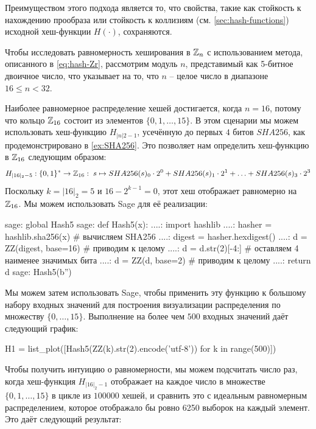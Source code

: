Преимуществом этого подхода является то, что свойства, такие как стойкость к нахождению прообраза или стойкость к коллизиям (см. \secname{} \ref{sec:hash-functions}) исходной хеш-функции $H(\cdot)$, сохраняются.
\begin{example} Чтобы исследовать равномерность хеширования в $\mathbb{Z}_n$ с использованием метода, описанного в \ref{eq:hash-Zr}, рассмотрим модуль $n$, представимый как 5-битное двоичное число, что указывает на то, что $n$ -- целое число в диапазоне $16 \leq n < 32$.

Наиболее равномерное распределение хешей достигается, когда $n = 16$, потому что кольцо $\mathbb{Z}_{16}$ состоит из элементов $\{0, 1, \ldots, 15\}$. В этом сценарии мы можем использовать хеш-функцию $H_{|n|2-1}$, усечённую до первых $4$ битов $SHA256$, как продемонстрировано в \examplename{} \ref{ex:SHA256}. Это позволяет нам определить хеш-функцию в $\mathbb{Z}_{16}$ следующим образом:
$$
H_{|16|_2-5}: \{0,1\}^* \to \mathbb{Z}_{16}:\; s\mapsto
SHA256(s)_0\cdot 2^0 + SHA256(s)_1\cdot 2^1 + \ldots + SHA256(s)_3\cdot 2^3
$$
Поскольку $k=|16|_2=5$ и $16-2^{k-1}=0$, этот хеш отображает равномерно на $\mathbb{Z}_{16}$. Мы можем использовать Sage для её реализации:
\begin{sagecommandline}
sage: global Hash5
sage: def Hash5(x):
....:     import hashlib
....:     hasher = hashlib.sha256(x) # вычисляем SHA256
....:     digest = hasher.hexdigest()
....:     d = ZZ(digest, base=16) # приводим к целому
....:     d = d.str(2)[-4:] # оставляем 4 наименее значимых бита
....:     d = ZZ(d, base=2) # приводим к целому
....:     return d
sage: Hash5(b'')
\end{sagecommandline}
Мы можем затем использовать Sage, чтобы применить эту функцию к большому набору входных значений для построения визуализации распределения по множеству $\{0,\ldots,15\}$. Выполнение на более чем $500$ входных значений даёт следующий график:
\begin{sagesilent}
H1 = list_plot([Hash5(ZZ(k).str(2).encode('utf-8')) for k in range(500)])
\end{sagesilent}
\begin{center}
\end{center}
Чтобы получить интуицию о равномерности, мы можем подсчитать число раз, когда хеш-функция $H_{|16|_2-1}$ отображает на каждое число в множестве $\{0,1,\ldots,15\}$ в цикле из $100000$ хешей, и сравнить это с идеальным равномерным распределением, которое отображало бы ровно 6250 выборок на каждый элемент. Это даёт следующий результат:
\begin{sagesilent}

\end{sagesilent}
\end{example}
